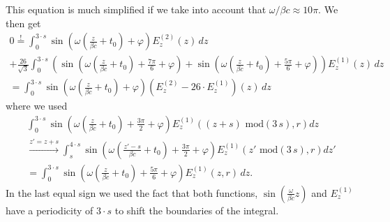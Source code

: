 This equation is much simplified if we take into account that $\omega / \beta c \approx 10\pi$. We then get
\begin{multline*}
0 \stackrel{!}{=} \int_{0}^{3\cdot s} \sin\left(\omega \left(\frac{z}{\beta c} + t_{0}\right) + \varphi\right) E_z^{(2)}(z)\, dz \\
                + \frac{26}{\sqrt{3}} \int_{0}^{3\cdot s}\left(\sin\left(\omega \left(\frac{z}{\beta c} + t_{0}\right) + \frac{7\pi}{6} + \varphi \right)
                                                        + \sin\left(\omega \left(\frac{z}{\beta c} + t_{0}\right) + \frac{5\pi}{6} + \varphi \right)\right) E_z^{(1)}(z)\, dz \\
       = \int_{0}^{3\cdot s}\sin\left(\omega \left(\frac{z}{\beta c} + t_{0}\right) + \varphi\right) \left(E_z^{(2)} - 26\cdot E_z^{(1)}\right)(z)\,dz
\end{multline*}
where we used
\begin{multline*}
\int_{0}^{3\cdot s} \sin\left(\omega \left(\frac{z}{\beta c} + t_{0}\right) + \frac{3\pi}{2} + \varphi\right) E_z^{(1)}((z + s) \text{ mod}(3\,s),r) dz \\
\stackrel{z' = z + s}{\longrightarrow} \int_{s}^{4\cdot s} \sin\left(\omega \left(\frac{z'-s}{\beta c} + t_{0} \right) + \frac{3\pi}{2} + \varphi\right)E_z^{(1)}(z' \text{ mod}(3\,s),r)dz' \\
= \int_{0}^{3\cdot s} \sin\left(\omega \left(\frac{z}{\beta c} + t_{0}\right) + \frac{5\pi}{6} + \varphi\right) E_z^{(1)}(z,r)\,dz.
\end{multline*}
In the last equal sign we used the fact that both functions, $\sin(\frac{\omega}{\beta c}z)$ and $E_z^{(1)}$ have a periodicity of $3\cdot s$ to shift the boundaries of the integral.

